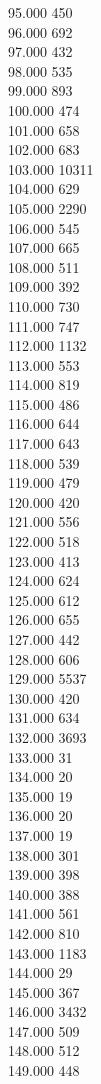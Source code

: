 { 95.000	450 \\
 96.000	692 \\
 97.000	432 \\
 98.000	535 \\
 99.000	893 \\
 100.000	474 \\
 101.000	658 \\
 102.000	683 \\
 103.000	10311 \\
 104.000	629 \\
 105.000	2290 \\
 106.000	545 \\
 107.000	665 \\
 108.000	511 \\
 109.000	392 \\
 110.000	730 \\
 111.000	747 \\
 112.000	1132 \\
 113.000	553 \\
 114.000	819 \\
 115.000	486 \\
 116.000	644 \\
 117.000	643 \\
 118.000	539 \\
 119.000	479 \\
 120.000	420 \\
 121.000	556 \\
 122.000	518 \\
 123.000	413 \\
 124.000	624 \\
 125.000	612 \\
 126.000	655 \\
 127.000	442 \\
 128.000	606 \\
 129.000	5537 \\
 130.000	420 \\
 131.000	634 \\
 132.000	3693 \\
 133.000	31 \\
 134.000	20 \\
 135.000	19 \\
 136.000	20 \\
 137.000	19 \\
 138.000	301 \\
 139.000	398 \\
 140.000	388 \\
 141.000	561 \\
 142.000	810 \\
 143.000	1183 \\
 144.000	29 \\
 145.000	367 \\
 146.000	3432 \\
 147.000	509 \\
 148.000	512 \\
 149.000	448 \\
}
